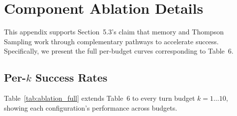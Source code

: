 \documentclass[11pt]{article}
\begin{document}
\section{Component Ablation Details}
\label{app:ablation}

This appendix supports Section~5.3's claim that memory and Thompson Sampling work through complementary pathways to accelerate success.
Specifically, we present the full per-budget curves corresponding to Table~6.

\subsection{Per-\texorpdfstring{$k$}{k} Success Rates}
Table~\ref{tab:ablation_full} extends Table~6 to every turn budget $k=1 \dots 10$, showing each configuration's performance across budgets.
\end{document}
